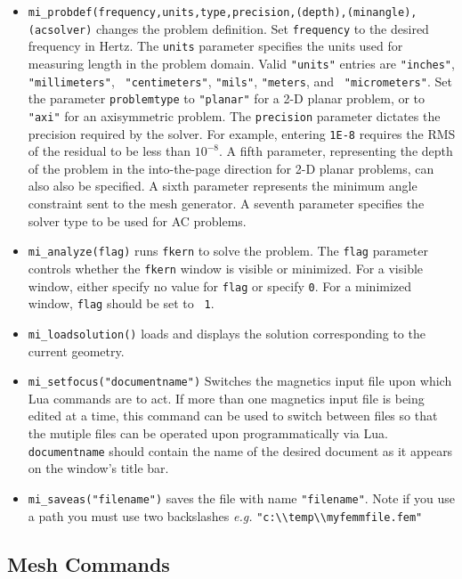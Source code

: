 \begin{itemize}
\item{\tt mi\_probdef(frequency,units,type,precision,(depth),(minangle),(acsolver)} changes the
problem definition. Set {\tt frequency} to the desired frequency in
Hertz.  The {\tt units} parameter specifies the units used for
measuring length in the problem domain.  Valid {\tt "units"}
entries are {\tt "inches"}, {\tt "millimeters"}, {\tt
"centimeters"}, {\tt "mils"}, {\tt "meters}, and {\tt
"micrometers"}. Set the parameter {\tt problemtype} to {\tt "planar"} for a 2-D
planar problem, or to {\tt "axi"} for an axisymmetric problem. The
{\tt precision} parameter dictates the precision required by the
solver.  For example, entering {\tt 1E-8} requires the RMS of the
residual to be less than $10^{-8}$.  A fifth parameter, representing the depth of
the problem in the into-the-page direction for 2-D planar problems, can also
also be specified. A sixth parameter represents the minimum angle constraint sent to the mesh generator.
A seventh parameter specifies the solver type to be used for AC problems.

\item{\tt mi\_analyze(flag)}
runs {\tt fkern} to solve the problem.  The {\tt flag} parameter
controls whether the {\tt fkern} window is visible or minimized.  For a
visible window, either specify no value for {\tt flag} or specify
{\tt 0}. For a minimized window, {\tt flag} should be set to {\tt
1}.

\item{\tt mi\_loadsolution()} loads and displays the solution corresponding to the
current geometry.

\item {\tt mi\_setfocus("documentname")} Switches the
magnetics input file upon which Lua commands are to act. If
more than one magnetics input file is being edited at a time,
this command can be used to switch between files so that the
mutiple files can be operated upon programmatically via Lua. {\tt
documentname} should contain the name of the desired document as
it appears on the window's title bar.

\item{\tt mi\_saveas("filename")} saves the file with name {\tt "filename"}.
Note if you use a path you must use two backslashes {\em e.g.}
\verb+"c:\\temp\\myfemmfile.fem"+
\end{itemize}

\subsection{Mesh Commands}

